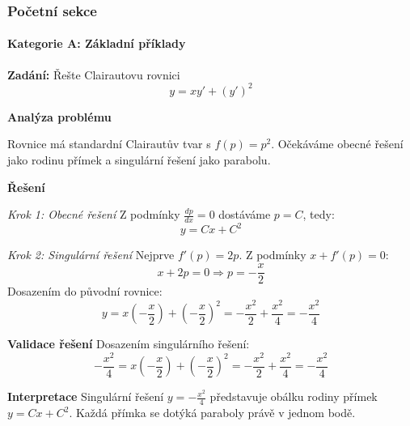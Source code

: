 \subsubsection{Početní sekce}
\label{subsubsec:pocetni-sekce}

\paragraph*{Kategorie A: Základní příklady}

\begin{example}
\label{ex:zakladni-clairaut}

\noindent\textbf{Zadání:} Řešte Clairautovu rovnici
\[
y = xy' + (y')^2
\]

\vspace{1.5\baselineskip}

\noindent\textbf{Analýza problému}

Rovnice má standardní Clairautův tvar s $f(p) = p^2$. Očekáváme obecné řešení jako rodinu přímek a singulární řešení jako parabolu.

\vspace{1.5\baselineskip}

\noindent\textbf{Řešení}

\noindent\textit{Krok 1: Obecné řešení}
Z podmínky $\frac{dp}{dx} = 0$ dostáváme $p = C$, tedy:
\[
y = Cx + C^2
\]

\vspace{1\baselineskip}

\noindent\textit{Krok 2: Singulární řešení}
Nejprve $f'(p) = 2p$. Z podmínky $x + f'(p) = 0$:
\[
x + 2p = 0 \Rightarrow p = -\frac{x}{2}
\]
Dosazením do původní rovnice:
\[
y = x\left(-\frac{x}{2}\right) + \left(-\frac{x}{2}\right)^2 = -\frac{x^2}{2} + \frac{x^2}{4} = -\frac{x^2}{4}
\]

\vspace{1.5\baselineskip}

\noindent\textbf{Validace řešení}
Dosazením singulárního řešení:
\[
-\frac{x^2}{4} = x\left(-\frac{x}{2}\right) + \left(-\frac{x}{2}\right)^2 = -\frac{x^2}{2} + \frac{x^2}{4} = -\frac{x^2}{4}
\]

\vspace{1.5\baselineskip}

\noindent\textbf{Interpretace}
Singulární řešení $y = -\frac{x^2}{4}$ představuje obálku rodiny přímek $y = Cx + C^2$. Každá přímka se dotýká paraboly právě v jednom bodě.

\end{example}

